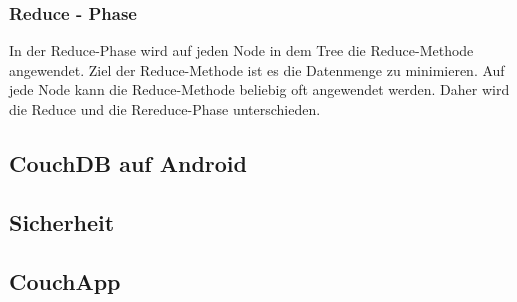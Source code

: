 \subsubsection{Reduce - Phase}

In der Reduce-Phase wird auf jeden Node in dem Tree die Reduce-Methode angewendet. Ziel der Reduce-Methode ist es die Datenmenge zu minimieren. Auf jede Node kann die Reduce-Methode beliebig oft angewendet werden. Daher wird die Reduce und die Rereduce-Phase unterschieden.

\subsection{CouchDB auf Android}

\subsection{Sicherheit}\label{security}

\subsection{CouchApp}

